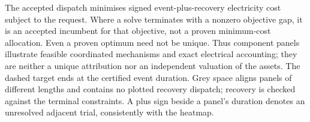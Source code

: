 The accepted dispatch minimises signed event-plus-recovery electricity cost subject to the request. Where a solve terminates with a nonzero objective gap, it is an accepted incumbent for that objective, not a proven minimum-cost allocation. Even a proven optimum need not be unique. Thus component panels illustrate feasible coordinated mechanisms and exact electrical accounting; they are neither a unique attribution nor an independent valuation of the assets. The dashed target ends at the certified event duration. Grey space aligns panels of different lengths and contains no plotted recovery dispatch; recovery is checked against the terminal constraints. A plus sign beside a panel's duration denotes an unresolved adjacent trial, consistently with the heatmap.
